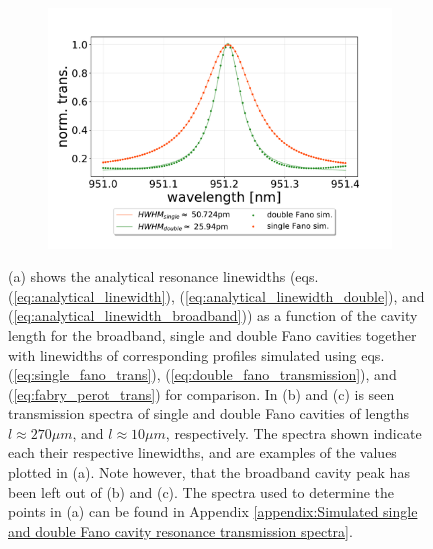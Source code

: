 \begin{figure}[h!]
\begin{subfigure}[c]{0.49\textwidth}
        \includegraphics[width=\textwidth]{figures/sim_single_vs_double_10um.pdf}
        \caption{}
        \label{fig:10um_double_and_single_fano_peak}
    \end{subfigure}
    \caption{(a) shows the analytical resonance linewidths (eqs. (\ref{eq:analytical_linewidth}), (\ref{eq:analytical_linewidth_double}), and (\ref{eq:analytical_linewidth_broadband})) as a function of the cavity length for the broadband, single and double Fano cavities together with linewidths of corresponding profiles simulated using eqs. (\ref{eq:single_fano_trans}), (\ref{eq:double_fano_transmission}), and (\ref{eq:fabry_perot_trans}) for comparison. In (b) and (c) is seen transmission spectra of single and double Fano cavities of lengths $l \approx 270 \mu m$, and $l \approx 10 \mu m$, respectively. The spectra shown indicate each their respective linewidths, and are examples of the values plotted in (a). Note however, that the broadband cavity peak has been left out of (b) and (c). The spectra used to determine the points in (a) can be found in Appendix \ref{appendix:Simulated single and double Fano cavity resonance transmission spectra}.}
\end{figure}

